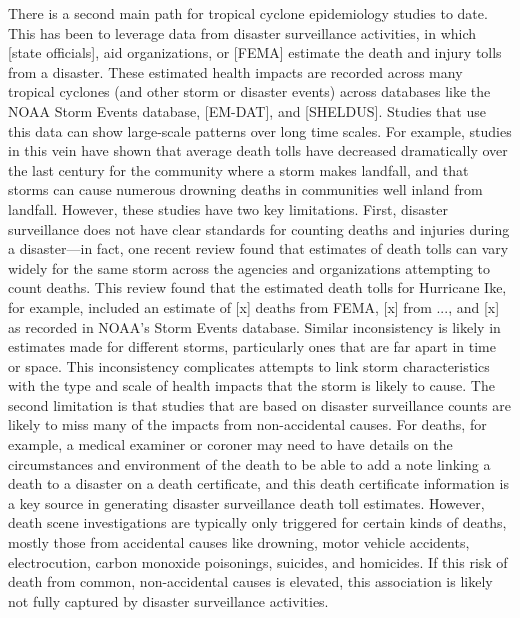 There is a second main path for tropical cyclone epidemiology studies to date.
This has been to leverage data from disaster surveillance activities, in which
[state officials], aid organizations, or [FEMA] estimate the death and injury
tolls from a disaster. These estimated health impacts are recorded across many
tropical cyclones (and other storm or disaster events) across databases like
the NOAA Storm Events database, [EM-DAT], and [SHELDUS]. Studies that use this
data can show large-scale patterns over long time scales. For example, studies
in this vein have shown that average death tolls have decreased dramatically
over the last century for the community where a storm makes landfall, and that
storms can cause numerous drowning deaths in communities well inland from
landfall. However, these studies have two key limitations. First, disaster
surveillance does not have clear standards for counting deaths and injuries
during a disaster---in fact, one recent review found that estimates of death
tolls can vary widely for the same storm across the agencies and organizations
attempting to count deaths. This review found that the estimated death tolls
for Hurricane Ike, for example, included an estimate of [x] deaths from FEMA,
[x] from ..., and [x] as recorded in NOAA's Storm Events database. Similar
inconsistency is likely in estimates made for different storms, particularly
ones that are far apart in time or space. This inconsistency complicates
attempts to link storm characteristics with the type and scale of health
impacts that the storm is likely to cause. The second limitation is that
studies that are based on disaster surveillance counts are likely to miss many
of the impacts from non-accidental causes. For deaths, for example, a medical
examiner or coroner may need to have details on the circumstances and
environment of the death to be able to add a note linking a death to a disaster
on a death certificate, and this death certificate information is a key source
in generating disaster surveillance death toll estimates. However, death scene
investigations are typically only triggered for certain kinds of deaths, mostly
those from accidental causes like drowning, motor vehicle accidents,
electrocution, carbon monoxide poisonings, suicides, and homicides. If this
risk of death from common, non-accidental causes is elevated, this association
is likely not fully captured by disaster surveillance activities. 

